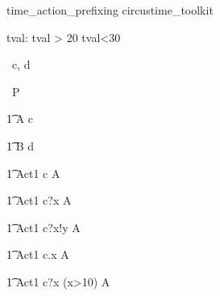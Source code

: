 \begin{zsection}
   \SECTION time\_action\_prefixing \parents circustime\_toolkit
\end{zsection}


\begin{axdef}
   tval: \nat
\where
   tval > 20 \land tval<30
\end{axdef}


\begin{circus}
   \circchannel\ c, d \\
\end{circus}

\begin{circus}
    \circprocess\ P \circdef \circbegin \\
\end{circus}

\begin{circusaction}
    	\t1 A \circdef c \then \Skip \\
\end{circusaction}

\begin{circusaction}
        \t1 B \circdef d \then \Skip \\
\end{circusaction}

\begin{circusaction}
        \t1 Act1 \circdef  c \then {} \rcirctime A  \\
\end{circusaction}


\begin{circusaction}
        \t1 Act1 \circdef  c?x \then {} \rcirctime A  \\
\end{circusaction}

\begin{circusaction}
        \t1 Act1 \circdef  c?x!y \then {} \rcirctime A  \\
\end{circusaction}

\begin{circusaction}
        \t1 Act1 \circdef  c.x \then {} \rcirctime A  \\
\end{circusaction}

\begin{circusaction}
        \t1 Act1 \circdef  c?x \prefixcolon (x>10) \then  A  \\
\end{circusaction}

